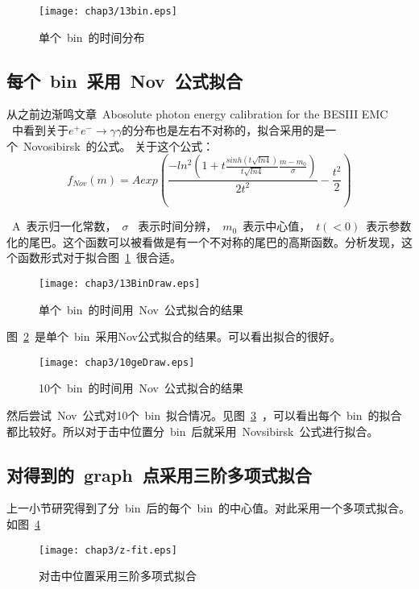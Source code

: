\begin{figure}[htbp]
\centering
\texttt{[image: chap3/13bin.eps]}
\caption{单个~bin~的时间分布}
\label{fig:13bin}
\end{figure}

\subsection{每个~bin~采用~Nov~公式拟合}

从之前边渐鸣文章~Abosolute photon energy calibration for the BESIII EMC~ \cite{Bian:2010aa}~中看到关于${e^{+}e^{-} \to \gamma \gamma}$的分布也是左右不对称的，拟合采用的是一个~Novosibirsk~的公式。
关于这个公式：
\begin{displaymath}
f_{Nov}(m)=Aexp(\frac{-ln^2(1+t\frac{sinh(t\sqrt{ln4})}{t\sqrt{ln4}}\frac{m-m_{0}}{\sigma})}{2t^2}-\frac{t^2}{2}) %
\end{displaymath}


~A~表示归一化常数，~$\sigma$~
表示时间分辨，~$m_{0}$~表示中心值，~$t(<0)$~表示参数化的尾巴。这个函数可以被看做是有一个不对称的尾巴的高斯函数。分析发现，这个函数形式对于拟合图~\ref{fig:13bin}~很合适。

\begin{figure}[htbp]
\centering
\texttt{[image: chap3/13BinDraw.eps]}
\caption{单个~bin~的时间用~Nov~公式拟合的结果}
\label{fig:13BinDraw}
\end{figure}

图~\ref{fig:13BinDraw}~是单个~bin~采用Nov公式拟合的结果。可以看出拟合的很好。

\begin{figure}[htbp]
\centering
\texttt{[image: chap3/10geDraw.eps]}
\caption{10个~bin~的时间用~Nov~公式拟合的结果}
\label{fig:10geDraw}
\end{figure}

然后尝试~Nov~公式对10个~bin~拟合情况。见图~\ref{fig:10geDraw}~，可以看出每个~bin~的拟合都比较好。所以对于击中位置分~bin~后就采用~Novsibirsk~公式进行拟合。

\subsection{对得到的~graph~点采用三阶多项式拟合}
上一小节研究得到了分~bin~后的每个~bin~的中心值。对此采用一个多项式拟合。如图~\ref{fig:z-fit}~

\begin{figure}[htbp]
\centering
\texttt{[image: chap3/z-fit.eps]}
\caption{对击中位置采用三阶多项式拟合}
\label{fig:z-fit}
\end{figure}

